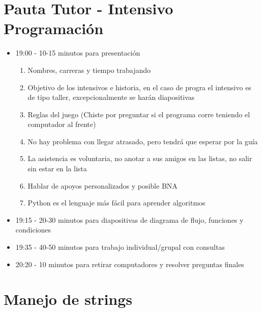 \documentclass[spanish, fleqn]{scrartcl}
\begin{document}
\vspace*{-0.4cm}
\section*{Pauta Tutor - Intensivo Programación}

\begin{itemize}
    \item 19:00 -   10-15 minutos para presentación
    \begin{enumerate}
        \item Nombres, carreras y tiempo trabajando
        
        \item Objetivo de los intensivos e historia, en el caso de progra el intensivo es de tipo taller, excepcionalmente se harán diapositivas
        
        \item Reglas del juego (Chiste por preguntar si el programa corre teniendo el computador al frente)
        
        \item No hay problema con llegar atrasado, pero tendrá que esperar por la guía
        
        \item La asistencia es voluntaria, no anotar a sus amigos en las listas, no salir sin estar en la lista
        
        \item Hablar de apoyos personalizados y posible BNA
        
        \item Python es el lenguaje más fácil para aprender algoritmos
    \end{enumerate}
        
    \item 19:15 -   20-30 minutos para diapositivas de diagrama de flujo, funciones y condiciones
    
    \item 19:35 -   40-50 minutos para trabajo individual/grupal con consultas
    
    \item 20:20 -   10 minutos para retirar computadores y resolver preguntas finales
\end{itemize}

\section{Manejo de strings}
\end{document}

